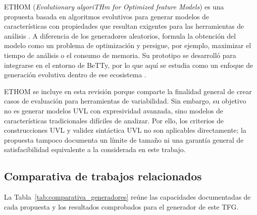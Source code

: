 ETHOM (\textit{Evolutionary algoriTHm for Optimized feature Models}) es una
propuesta basada en algoritmos evolutivos para generar modelos de
características con propiedades que resultan exigentes para las herramientas de
análisis \cite{ethom}. A diferencia de los generadores aleatorios, formula la
obtención del modelo como un problema de optimización y persigue, por ejemplo,
maximizar el tiempo de análisis o el consumo de memoria. Su prototipo se desarrolló para integrarse en el entorno de BeTTy, por lo
que aquí se estudia como un enfoque de generación evolutiva dentro de ese
ecosistema \cite{ethom}.

ETHOM se incluye en esta revisión porque comparte la finalidad general de crear
casos de evaluación para herramientas de variabilidad. Sin embargo, su objetivo
no es generar modelos UVL con expresividad avanzada, sino modelos de
características tradicionales difíciles de analizar. Por ello, los criterios de
construcciones UVL y validez sintáctica UVL no son aplicables directamente; la
propuesta tampoco documenta un límite de tamaño ni una garantía general de
satisfacibilidad equivalente a la considerada en este trabajo.

\subsection{Comparativa de trabajos relacionados}
\label{subsec:comparativa_relacionados}

La Tabla~\ref{tab:comparativa_generadores} reúne las capacidades documentadas de cada propuesta y los resultados comprobados para el generador de este TFG.

